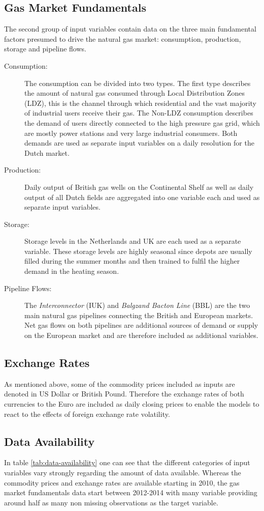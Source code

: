 \subsection{Gas Market Fundamentals}
The second group of input variables contain data on the three main fundamental factors presumed to drive the natural gas market: consumption, production, storage and pipeline flows. 
\begin{description}
\item[Consumption:] The consumption can be divided into two types. The first type describes the amount of natural gas consumed through Local Distribution Zones (LDZ), this is the channel through which residential and the vast majority of industrial users receive their gas. The Non-LDZ consumption describes the demand of users directly connected to the high pressure gas grid, which are mostly power stations and very large industrial consumers. Both demands are used as separate input variables on a daily resolution for the Dutch market.
\item[Production:] Daily output of British gas wells on the Continental Shelf as well as daily output of all Dutch fields are aggregated into one variable each and used as separate input variables.
\item[Storage:] Storage levels in the Netherlands and UK are each used as a separate variable. These storage levels are highly seasonal since depots are usually filled during the summer months and then trained to fulfil the higher demand in the heating season.
\item[Pipeline Flows:] The \textit{Interconnector} (IUK) and \textit{Balgzand Bacton Line} (BBL) are the two main natural gas pipelines connecting the British and European markets. Net gas flows on both pipelines are additional sources of demand or supply on the European market and are therefore included as additional variables.
\end{description}
\subsection{Exchange Rates}
As mentioned above, some of the commodity prices included as inputs are denoted in US Dollar or British Pound. Therefore the exchange rates of both currencies to the Euro are included as daily closing prices to enable the models to react to the effects of foreign exchange rate volatility.
\subsection{Data Availability}\label{Sec:Data-Availability}
In table \ref{tab:data-availability} one can see that the different categories of input variables vary strongly regarding the amount of data available. Whereas the commodity prices and exchange rates are available starting in 2010, the gas market fundamentals data start between 2012-2014 with many variable providing around half as many non missing observations as the target variable. 